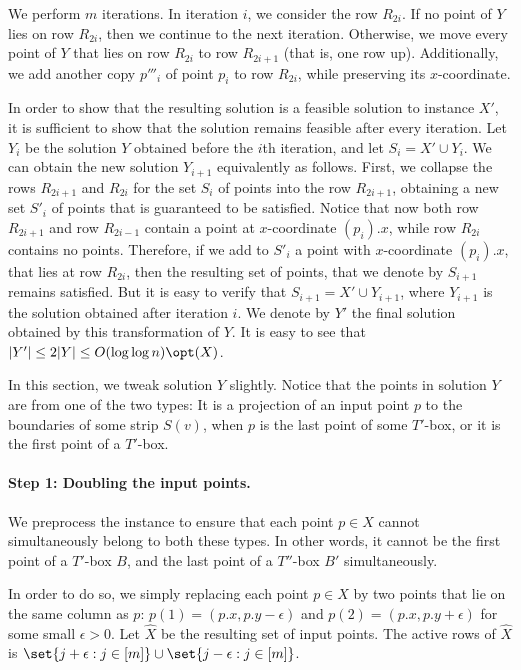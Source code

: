 \documentclass{toc}
\begin{document}
We perform $m$ iterations. In iteration $i$, we consider the row $R_{2i}$. If no point of $Y$ lies on row $R_{2i}$, then we continue to the next iteration. Otherwise, we move every point of $Y$ that lies on row $R_{2i}$ to row $R_{2i+1}$ (that is, one row up). Additionally, we add another copy $p'''_i$ of point $p_i$ to row $R_{2i}$, while preserving its $x$-coordinate.

In order to show that the resulting solution is a feasible solution to instance $X'$, it is sufficient to show that the solution remains feasible after every iteration. Let $Y_i$ be the solution $Y$ obtained before the $i$th iteration, and let $S_i=X'\cup Y_i$. We can obtain the new solution $Y_{i+1}$ equivalently as follows. First, we collapse the rows $R_{2i+1}$ and $R_{2i}$ for the set $S_i$ of points into the row $R_{2i+1}$, obtaining a new set $S'_i$ of points that is guaranteed to be satisfied. Notice that now both row $R_{2i+1}$ and row $R_{2i-1}$ contain a point at $x$-coordinate $(p_i).x$, while row $R_{2i}$ contains no points. Therefore, if we add to $S'_i$ a point with $x$-coordinate $(p_i).x$, that lies at row $R_{2i}$, then the resulting set of points, that we denote by $S_{i+1}$ remains satisfied. But it is easy to verify that $S_{i+1}=X'\cup Y_{i+1}$, where $Y_{i+1}$ is the solution obtained after iteration $i$.
We denote by $Y'$ the final solution obtained by this transformation of $Y$. It is easy to see that $|Y'|\leq 2|Y|\leq O(\log\log n)\opt(X)$.



\iffalse
In this section, we tweak solution $Y$ slightly. 
Notice that the points in solution $Y$ are from one of the two types: It is a projection of an input point $p$ to the boundaries of some strip $S(v)$, when $p$ is the last point of some $T'$-box, or it is the first point of a $T'$-box. 


\paragraph*{Step 1: Doubling the input points.} We preprocess the instance to ensure that each point $p \in X$ cannot simultaneously belong to both these types. In other words, it cannot be the first point of a $T'$-box $B$, and the last point of a $T''$-box $B'$ simultaneously.

In order to do so, we simply replacing each point $p\in X$ by two points that lie on the same column as $p$: $p(1) = (p.x, p.y-\epsilon)$ and $p(2) = (p.x, p.y+\epsilon)$ for some small $\epsilon >0$.  Let $\hat{X}$ be the resulting set of input points. The active rows of $\hat{X}$ is $\set{j + \epsilon: j \in [m]}\cup \set{j-\epsilon: j \in [m]}$.  
\end{document}
